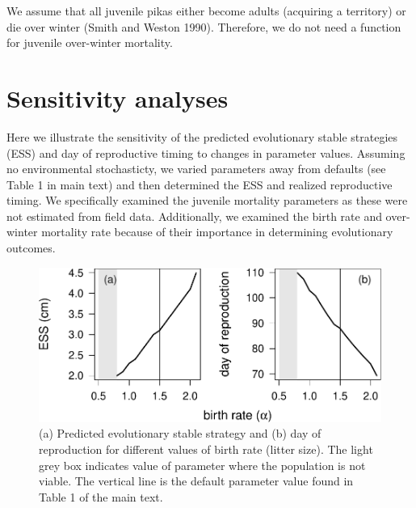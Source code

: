 \documentclass[12pt,]{article}
\begin{document}
We assume that all juvenile pikas either become adults (acquiring a
territory) or die over winter (Smith and Weston 1990). Therefore, we do
not need a function for juvenile over-winter mortality.

\pagebreak

\section{Sensitivity analyses}

Here we illustrate the sensitivity of the predicted evolutionary stable
strategies (ESS) and day of reproductive timing to changes in parameter
values. Assuming no environmental stochasticty, we varied parameters
away from defaults (see Table 1 in main text) and then determined the
ESS and realized reproductive timing. We specifically examined the
juvenile mortality parameters as these were not estimated from field
data. Additionally, we examined the birth rate and over-winter mortality
rate because of their importance in determining evolutionary outcomes.

\begin{figure}
\centering
\includegraphics{White_et_al_pika_phenology_supp_mat_files/figure-latex/unnamed-chunk-6-1.pdf}
\caption{(a) Predicted evolutionary stable strategy and (b) day of
reproduction for different values of birth rate (litter size). The light
grey box indicates value of parameter where the population is not
viable. The vertical line is the default parameter value found in Table
1 of the main text. \label{fig:ESS_vs_birth_rate}}
\end{figure}
\end{document}
